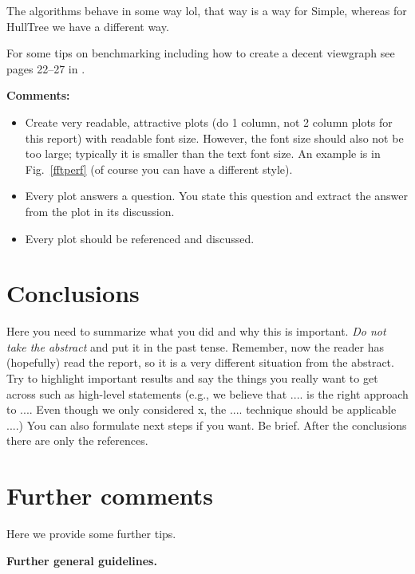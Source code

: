 \documentclass[letterpaper]{article}
\newcommand{\mypar}[1]{{\bf #1.}}
\begin{document}
The algorithms behave in some way lol, that way is a way for Simple, whereas for HullTree we have a different way.

For some tips on benchmarking including how to create a decent viewgraph see pages 22--27 in \cite{Pueschel:10}.

{\bf Comments:}
\begin{itemize}
\item Create very readable, attractive plots (do 1 column, not 2 column plots
for this report) with readable font size. However, the font size should also not be too large; typically it is smaller than the text font size.
An example is in Fig.~\ref{fftperf} (of course you can have a different style).
\item Every plot answers a question. You state this question and extract the
answer from the plot in its discussion.
\item Every plot should be referenced and discussed.
\end{itemize}

\section{Conclusions}

Here you need to summarize what you did and why this is
important. {\em Do not take the abstract} and put it in the past
tense. Remember, now the reader has (hopefully) read the report, so it
is a very different situation from the abstract. Try to highlight
important results and say the things you really want to get across
such as high-level statements (e.g., we believe that .... is the right
approach to .... Even though we only considered x, the
.... technique should be applicable ....) You can also formulate next
steps if you want. Be brief. After the conclusions there are only the references.

\section{Further comments}

Here we provide some further tips.

\mypar{Further general guidelines}
\end{document}
